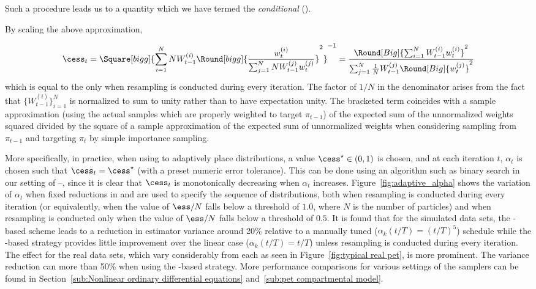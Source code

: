 Such a procedure leads us to a quantity which we have termed the \emph{conditional} \ess (\cess).
\begin{draftpar}
By scaling the above approximation,
\end{draftpar}%
\begin{equation}
  \cess_t = \Square[bigg]{\sum_{i=1}^N N W_{t-1}^{(i)} \Round[bigg]{
        \frac{w_t^{(i)}}{\sum_{j=1}^N N W_{t-1}^{(j)}w_t^{(j)}}}^2}^{-1}
  = \frac{\Round[Big]{\sum_{i=1}^NW_{t-1}^{(i)}w_t^{(i)}}^2}
  {\sum_{j=1}^N \frac{1}{N} W_{t-1}^{(j)} \Round[Big]{w_t^{(j)}}^2}
\end{equation}
which is equal to the \ess only when resampling is conducted during every iteration. The factor of $1/N$ in the denominator arises from the fact that $\{W_{t-1}^{(i)}\}_{i=1}^N$ is normalized to sum to unity rather than to have expectation unity. The bracketed term coincides with a sample approximation (using the actual samples which are properly weighted to target $\pi_{t-1}$) of the expected sum of the unnormalized weights squared divided by the square of a sample approximation of the expected sum of unnormalized weights when considering sampling from $\pi_{t-1}$ and targeting $\pi_t$ by simple importance sampling.



More specifically, in practice, when using \cess to adaptively place distributions, a value $\cess^\star \in (0, 1)$ is chosen, and at each iteration $t$, $\alpha_t$ is chosen such that $\cess_t = \cess^\star$ (with a preset numeric error tolerance). This can be done using an algorithm such as binary search in our setting of \smc[1]--\smc[3], since it is clear that $\cess_t$ is monotonically decreasing when $\alpha_t$ increases. Figure~\ref{fig:adaptive_alpha} shows the variation of $\alpha_t$ when fixed reductions in \ess and \cess are used to specify the sequence of distributions, both when resampling is conducted during every iteration (or equivalently, when the value of $\ess/N$ falls below a threshold of $1.0$, where $N$ is the number of particles) and when resampling is conducted only when the value of $\ess/N$ falls below a threshold of $0.5$. It is found that for the simulated \pet data sets, the \cess-based scheme leads to a reduction in estimator variance around 20\% relative to a manually tuned ($\alpha_k(t/T) = (t/T)^5$) schedule while the \ess-based strategy provides little improvement over the linear case ($\alpha_k(t/T) = t/T$) unless resampling is conducted during every iteration. The effect for the real data sets, which vary considerably from each  as seen in Figure~\ref{fig:typical real pet}, is more prominent. The variance reduction can  more than 50\% when using the \cess-based strategy. More performance comparisons for various settings of the samplers can be found in Section~\ref{sub:Nonlinear ordinary differential equations} and~\ref{sub:pet compartmental model}.

